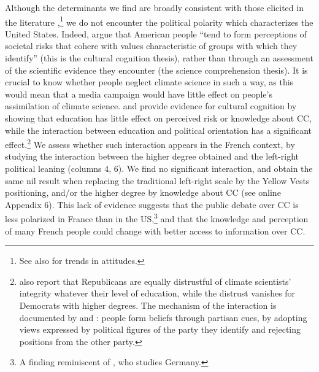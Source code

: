 \documentclass[english,5p,authoryear]{elsarticle}
\begin{document}
Although the determinants we find are broadly consistent with those elicited in the literature \citep{upham_public_2009,whitmarsh_scepticism_2011, ademe_representations_2018},\footnote{See also \citet{capstick_international_2015} for trends in attitudes.} we do not encounter the political polarity which characterizes the United States. Indeed, \citet{kahan_polarizing_2012} argue that American people ``tend to form perceptions of societal risks that cohere with values characteristic of groups with which they identify'' (this is the cultural cognition thesis), rather than through an assessment of the scientific evidence they encounter (the science comprehension thesis). It is crucial to know whether people neglect climate science in such a way, as this would mean that a media campaign would have little effect on people's assimilation of climate science. \citet{kahan_polarizing_2012} and \citet{mccright_politicization_2011} provide evidence for cultural cognition by showing that education has little effect on perceived risk or knowledge about CC, while the interaction between education and political orientation has a significant effect.\footnote{\citet{funk_politics_2016} also report that Republicans are equally distrustful of climate scientists' integrity whatever their level of education, while the distrust vanishes for Democrats with higher degrees. The mechanism of the interaction is documented by \citet{ehret_partisan_2018} and \citet{van_boven_psychological_2018}: people form beliefs through partisan cues, by adopting views expressed by political figures of the party they identify and rejecting positions from the other party.} We assess whether such interaction appears in the French context, by studying the interaction between the higher degree obtained and the left-right political leaning (columns 4, 6). We find no significant interaction, and obtain the same nil result when replacing the traditional left-right scale by the Yellow Vests positioning, and/or the higher degree by knowledge about CC (see online Appendix 6). This lack of evidence suggests that the public debate over CC is less polarized in France than in the US,\footnote{A finding reminiscent of \citet{ziegler_political_2017}, who studies Germany.} and that the knowledge and perception of many French people could change with better access to information over CC. %

\end{document}
